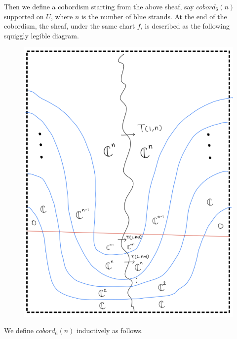 Then we define a cobordism starting from the above sheaf, say $cobord_6(n)$ supported on $U$, where $n$ is the number of blue strands. At the end of the cobordism, the sheaf, under the same chart $f$, is described as the following squiggly legible diagram.
\begin{figure}[H]
    \centering
    \includegraphics[scale = 0.95]{diagrams/cobord6/7.png}
    \caption{}
    \label{fig:your-label}
\end{figure}
\pagebreak 
We define $cobord_6(n)$ inductively as follows.
